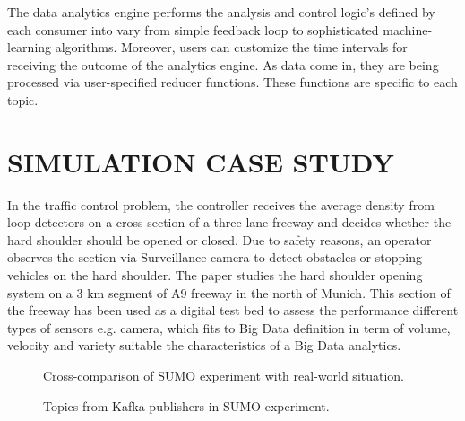 \documentclass[sigconf]{acmart}
\begin{document}
The data analytics engine performs the analysis and control logic's defined by each consumer into vary from simple feedback loop to sophisticated machine-learning algorithms. Moreover, users can customize the time intervals for receiving the outcome of the analytics engine. As data come in, they are being processed via user-specified reducer functions. These functions are specific to each topic.

\section{SIMULATION CASE STUDY}

In the traffic control problem, the controller receives the average density from loop detectors on a cross section of a three-lane freeway and decides whether the hard shoulder should be opened or closed. Due to safety reasons, an operator observes the section via Surveillance camera to detect obstacles or stopping vehicles on the hard shoulder. The paper studies the hard shoulder opening system on a 3 km segment of A9 freeway in the north of Munich. This section of the freeway has been used as a digital test bed to assess the performance different types of sensors e.g. camera, which fits to Big Data definition in term of volume, velocity and variety suitable the characteristics of a Big Data analytics. 
\begin{figure}[h]
\centering
{}
\caption{Cross-comparison of SUMO experiment with real-world situation.}
\label{fig:2}
\end{figure}


\begin{figure}[htbp]
\centering
{}
\caption{Topics from Kafka publishers in SUMO experiment.}
\label{fig:3}
\end{figure}
\end{document}
